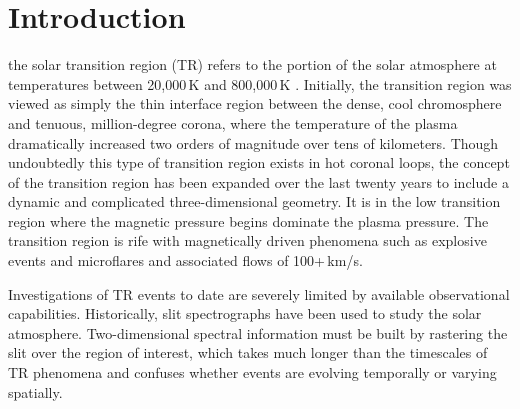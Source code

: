 
\section{Introduction}

     the solar transition region (TR) refers to the portion of the solar atmosphere  at temperatures between 20,000\,K and 800,000\,K . 
    Initially, the transition region was viewed as simply the thin interface region between the dense, cool chromosphere and tenuous, million-degree corona, where the temperature of the plasma dramatically increased two orders of magnitude over tens of kilometers. 
    Though undoubtedly this type of transition region exists in hot coronal loops, the concept of the transition region has been expanded over the last twenty years to include a dynamic and complicated three-dimensional geometry. 
    It is in the low transition region where the magnetic pressure begins dominate the plasma pressure. The transition region is rife with magnetically driven phenomena such as explosive events \cite[e.g.,][]{dere1991} and microflares \citep{gontikakis2012} and associated flows of 100+\,km/s.  
    
    Investigations of TR events to date are severely limited by available observational capabilities. 
    Historically, slit spectrographs have been used to study the solar atmosphere.   
    Two-dimensional spectral information must be built by rastering the slit over the region of interest, which takes much longer than the timescales of TR phenomena and confuses whether events are evolving temporally or varying spatially.  
    
